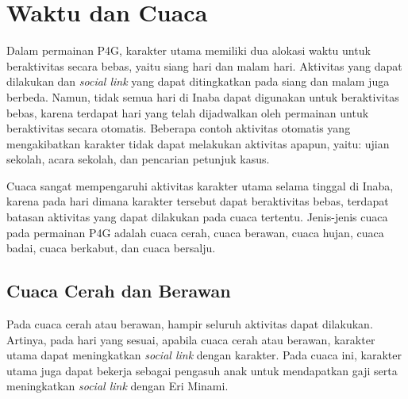

\section{Waktu dan Cuaca}
Dalam permainan P4G, karakter utama memiliki dua alokasi waktu untuk beraktivitas secara bebas, yaitu siang hari dan malam hari. Aktivitas yang dapat dilakukan dan \textit{social link} yang dapat ditingkatkan pada siang dan malam juga berbeda.
Namun, tidak semua hari di Inaba dapat digunakan untuk beraktivitas bebas, karena terdapat hari yang telah dijadwalkan oleh permainan untuk beraktivitas secara otomatis.
Beberapa contoh aktivitas otomatis yang mengakibatkan karakter tidak dapat melakukan aktivitas apapun, yaitu: ujian sekolah, acara sekolah, dan pencarian petunjuk kasus.

Cuaca sangat mempengaruhi aktivitas karakter utama selama tinggal di Inaba, karena pada hari dimana karakter tersebut dapat beraktivitas bebas, terdapat batasan aktivitas yang dapat dilakukan pada cuaca tertentu. Jenis-jenis cuaca pada permainan P4G adalah cuaca cerah, cuaca berawan, cuaca hujan, cuaca badai, cuaca berkabut, dan cuaca bersalju.

\subsection{Cuaca Cerah dan Berawan}
Pada cuaca cerah atau berawan, hampir seluruh aktivitas dapat dilakukan. Artinya, pada hari yang sesuai, apabila cuaca cerah atau berawan, karakter utama dapat meningkatkan \textit{social link} dengan karakter. Pada cuaca ini, karakter utama juga dapat bekerja sebagai pengasuh anak untuk mendapatkan gaji serta meningkatkan \textit{social link} dengan Eri Minami.

